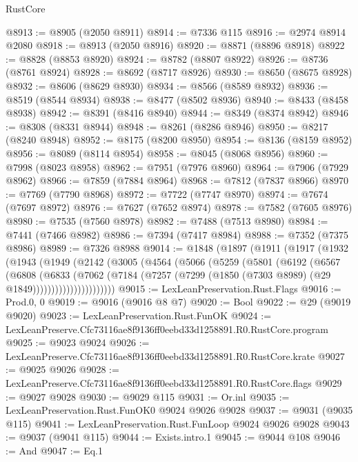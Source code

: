 \begin{lexlean}{RustCore}
\begin{coremodule}
@8913 := @8905 (@2050 @8911)
@8914 := @7336 @115
@8916 := @2974 @8914 @2080
@8918 := @8913 (@2050 @8916)
@8920 := @8871 (@8896 @8918)
@8922 := @8828 (@8853 @8920)
@8924 := @8782 (@8807 @8922)
@8926 := @8736 (@8761 @8924)
@8928 := @8692 (@8717 @8926)
@8930 := @8650 (@8675 @8928)
@8932 := @8606 (@8629 @8930)
@8934 := @8566 (@8589 @8932)
@8936 := @8519 (@8544 @8934)
@8938 := @8477 (@8502 @8936)
@8940 := @8433 (@8458 @8938)
@8942 := @8391 (@8416 @8940)
@8944 := @8349 (@8374 @8942)
@8946 := @8308 (@8331 @8944)
@8948 := @8261 (@8286 @8946)
@8950 := @8217 (@8240 @8948)
@8952 := @8175 (@8200 @8950)
@8954 := @8136 (@8159 @8952)
@8956 := @8089 (@8114 @8954)
@8958 := @8045 (@8068 @8956)
@8960 := @7998 (@8023 @8958)
@8962 := @7951 (@7976 @8960)
@8964 := @7906 (@7929 @8962)
@8966 := @7859 (@7884 @8964)
@8968 := @7812 (@7837 @8966)
@8970 := @7769 (@7790 @8968)
@8972 := @7722 (@7747 @8970)
@8974 := @7674 (@7697 @8972)
@8976 := @7627 (@7652 @8974)
@8978 := @7582 (@7605 @8976)
@8980 := @7535 (@7560 @8978)
@8982 := @7488 (@7513 @8980)
@8984 := @7441 (@7466 @8982)
@8986 := @7394 (@7417 @8984)
@8988 := @7352 (@7375 @8986)
@8989 := @7326 @8988
@9014 := @1848
    (@1897
      (@1911
        (@1917
          (@1932
            (@1943
              (@1949
                (@2142
                  (@3005
                    (@4564
                      (@5066
                        (@5259
                          (@5801
                            (@6192
                              (@6567
                                (@6808
                                  (@6833
                                    (@7062
                                      (@7184
                                        (@7257
                                          (@7299
                                            (@1850 (@7303 @8989) (@29 @1849))))))))))))))))))))))
@9015 := LexLeanPreservation.Rust.Flags
@9016 := Prod.{0, 0}
@9019 := @9016 (@9016 @8 @7)
@9020 := Bool
@9022 := @29 (@9019 @9020)
@9023 := LexLeanPreservation.Rust.FunOK
@9024 := LexLeanPreserve.Cfc73116ae8f9136ff0eebd33d1258891.R0.RustCore.program
@9025 := @9023 @9024
@9026 := LexLeanPreserve.Cfc73116ae8f9136ff0eebd33d1258891.R0.RustCore.krate
@9027 := @9025 @9026
@9028 := LexLeanPreserve.Cfc73116ae8f9136ff0eebd33d1258891.R0.RustCore.flags
@9029 := @9027 @9028
@9030 := @9029 @115
@9031 := Or.inl
@9035 := LexLeanPreservation.Rust.FunOK0 @9024 @9026 @9028
@9037 := @9031 (@9035 @115)
@9041 := LexLeanPreservation.Rust.FunLoop @9024 @9026 @9028
@9043 := @9037 (@9041 @115)
@9044 := Exists.intro.{1}
@9045 := @9044 @108
@9046 := And
@9047 := Eq.{1}

\end{coremodule}
\end{lexlean}
